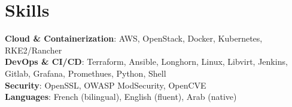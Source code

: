 \section{Skills}
    \begin{itemize}[leftmargin=0.15in, label={}]
	\small{\item{
	\textbf{Cloud \& Containerization}{: AWS, OpenStack, Docker, Kubernetes, RKE2/Rancher} \\ 
        \textbf{DevOps \& CI/CD}{: Terraform, Ansible, Longhorn, Linux, Libvirt, Jenkins, Gitlab, Grafana, Promethues, Python, Shell} \\
	\textbf{Security}{: OpenSSL, OWASP ModSecurity, OpenCVE} \\
  	\textbf{Languages}{: French (bilingual), English (ﬂuent), Arab (native)} \\
	}}
    \end{itemize}